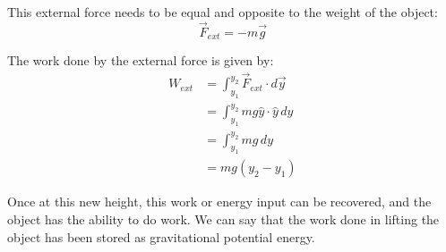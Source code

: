 \documentclass[11pt]{article}
\begin{document}
This external force needs to be equal and opposite to the weight of the object:
\[\vec{F}_{ext} = -m \vec{g}\]

The work done by the external force is given by:
\begin{align*}
W_{ext} &= \int_{y_1}^{y_2} \vec{F}_{ext} \cdot d \vec{y} \\
&= \int_{y_1}^{y_2} mg \hat{y} \cdot \hat{y} \, dy \\
&= \int_{y_1}^{y_2} mg \, dy \\
&= mg(y_2 - y_1)
\end{align*}

Once at this new height, this work or energy input can be recovered, and the object has the ability to do work. We can say that the work done in lifting the object has been stored as gravitational potential energy.
\end{document}
